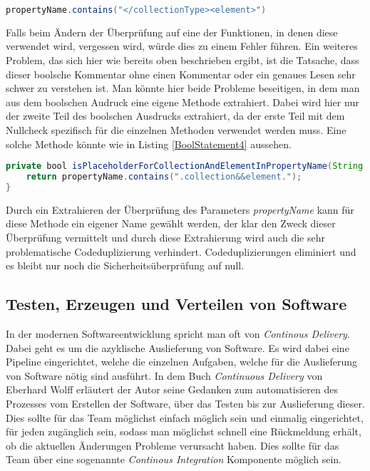 \begin{lstlisting}[language=Java, caption=Boolscher Ausdruck neu, label=lst:BoolStatement4]
 propertyName.contains("</collectionType><element>")
\end{lstlisting}

\SuperPar Falls beim Ändern der Überprüfung auf eine der Funktionen, in denen diese verwendet wird, vergessen wird, würde dies zu einem Fehler führen. Ein weiteres Problem, das sich hier wie bereits oben beschrieben ergibt, ist die Tatsache, dass dieser boolsche Kommentar ohne einen Kommentar oder ein genaues Lesen sehr schwer zu verstehen ist. Man könnte hier beide Probleme beseitigen, in dem man aus dem boolschen Audruck eine eigene Methode extrahiert. Dabei wird hier nur der zweite Teil des boolschen Ausdrucks extrahiert, da der erste Teil mit dem Nullcheck spezifisch für die einzelnen Methoden verwendet werden muss. Eine solche Methode könnte wie in Listing \ref{BoolStatement4} aussehen.

\begin{lstlisting}[language=Java, caption=Boolscher Ausdruck neu, label=lst:BoolStatement4]
private bool isPlaceholderForCollectionAndElementInPropertyName(String propertyName) {
	return propertyName.contains(".collection&&element.");
}
\end{lstlisting}

Durch ein Extrahieren der Überprüfung des Parameters \textit{propertyName} kann für diese Methode ein eigener Name gewählt werden, der klar den Zweck dieser Überprüfung vermittelt und durch diese Extrahierung wird auch die sehr problematische Codeduplizierung verhindert. Codeduplizierungen eliminiert und es bleibt nur noch die Sicherheitsüberprüfung auf null.

\subsection{Testen, Erzeugen und Verteilen von Software}

\SuperPar In der modernen Softwareentwicklung spricht man oft von \textit{Continous Delivery}. Dabei geht es um die azyklische Auslieferung von Software. Es wird dabei eine Pipeline eingerichtet, welche die einzelnen Aufgaben, welche für die Auslieferung von Software nötig sind ausführt. In dem Buch \textit{Continuous Delivery} von Eberhard Wolff erläutert der Autor seine Gedanken zum automatisieren des Prozesses vom Erstellen der Software, über das Testen bis zur Auslieferung dieser. Dies sollte für das Team möglichst einfach möglich sein und einmalig eingerichtet, für jeden zugänglich sein, sodass man möglichst schnell eine Rückmeldung erhält, ob die aktuellen Änderungen Probleme verursacht haben. Dies sollte für das Team über eine sogenannte \textit{Continous Integration} Komponente möglich sein.

